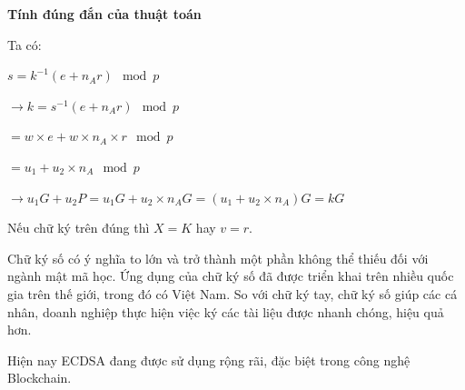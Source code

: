 \textbf{Tính đúng đắn của thuật toán}

Ta có:

$s = k^{-1}(e+ n_A r)\mod p$

$\to k = s^{-1}(e+ n_A r)\mod p$

$= w \times e + w \times n_A \times r \mod p$

$=u_1 + u_2 \times n_A \mod p$

$\to u_1G + u_2P = u_1G + u_2 \times n_A G = (u_1+u_2 \times n_A)G = kG$

Nếu chữ ký trên đúng thì $X=K$ hay $v=r$. \cite{ECDSA}



Chữ ký số có ý nghĩa to lớn và trở thành một phần không thể thiếu đối
với ngành mật mã học. Ứng dụng của chữ ký số đã được triển khai trên 
nhiều quốc gia trên thế giới, trong đó có Việt Nam. So với chữ ký tay, 
chữ ký số giúp các cá nhân, doanh nghiệp thực hiện việc ký các tài 
liệu được nhanh chóng, hiệu quả hơn. 

Hiện nay ECDSA đang được sử dụng rộng rãi, đặc biệt trong công nghệ Blockchain. 
